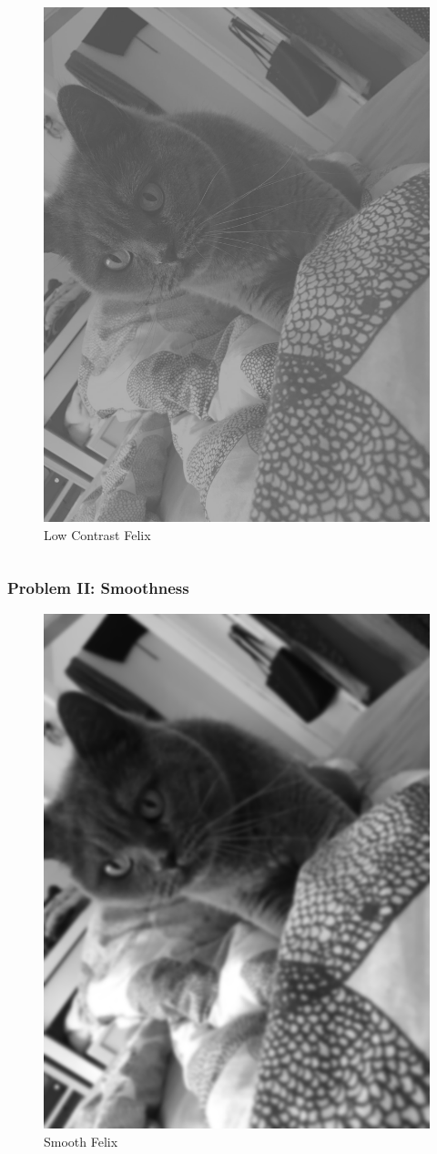 \begin{frame}
\begin{columns}
\begin{column}{0.5\textwidth}
\begin{center}
\begin{figure}
					\includegraphics[width=0.8\linewidth]{images/KadseLowContrast}
					\caption[Low Contrast Felix]{Low Contrast Felix}
					\label{fig:LowContrast}
				\end{figure}
			\end{center}
		\end{column}
	\end{columns}
\end{frame}

\begin{frame}
	\frametitle{Problem II: Smoothness}
	\begin{center}
		\begin{figure}
			\centering
			\includegraphics[width=0.4\linewidth]{images/KadseSmooth}
			\caption[Smooth Felix]{Smooth Felix}
			\label{fig:Smooth}
		\end{figure}
	\end{center}
\end{frame}

